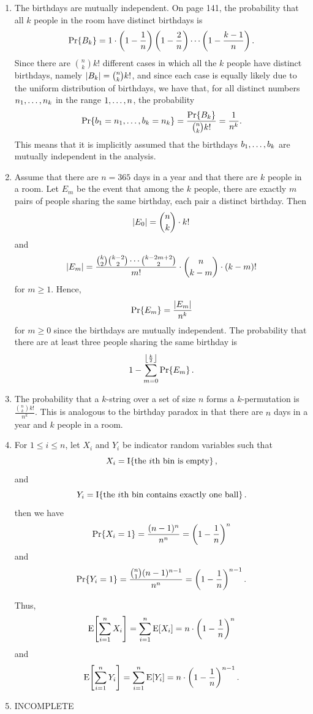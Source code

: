 \begin{enumerate}[\thesection-1]
Let $X$ be the number of tosses until some bin contains two balls. Then, for $2 \leq k \leq b + 1$ we have
\[
\pr{X = k} = \pr{\cmpl{A_k} \intsc B_{k - 1}} = \pr{B_{k - 1}} \pr{\cmpl{A_k} \given B_{k - 1}} = 1 \multp \parenf{1 - \frac{1}{b}} \parenf{1 - \frac{2}{b}} \etc \parenf{1 - \frac{k - 2}{b}} \multp \frac{k - 1}{b}.
\]
It suffices to compute
\[
\ex{X} = \sum^{b + 1}_{k = 2} k \pr{X = k}.
\]
%
\item The birthdays are mutually independent. On page 141, the probability that all $k$ people in the room have distinct birthdays is
\[
\Pr\!\left\{B_k\right\} = 1 \cdot \left(1 - \frac{1}{n}\right) \left(1 - \frac{2}{n}\right) \cdots \left(1 - \frac{k - 1}{n}\right).
\]
Since there are ${n \choose k} k!$ different cases in which all the $k$ people have distinct birthdays, namely $\left|B_k\right| = {n \choose k} k!$, and since each case is equally likely due to the uniform distribution of birthdays, we have that, for all distinct numbers $n_1, \ldots, n_k$ in the range $1, \ldots, n$, the probability
\[
\Pr\!\left\{b_1 = n_1, \ldots, b_k = n_k\right\} = \frac{\Pr\!\left\{B_k\right\}}{{n \choose k} k!} = \frac{1}{n^k}.
\]
This means that it is implicitly assumed that the birthdays $b_1, \ldots, b_k$ are mutually independent in the analysis.
%
\item Assume that there are $n = 365$ days in a year and that there are $k$ people in a room. Let $E_m$ be the event that among the $k$ people, there are exactly $m$ pairs of people sharing the same birthday, each pair a distinct birthday. Then
\[
\left|E_0\right| = {n \choose k} \cdot k!
\]
and
\[
\left|E_m\right| = \frac{{k \choose 2}{k - 2 \choose 2} \cdots {k - 2m + 2 \choose 2}}{m!} \cdot {n \choose k - m} \cdot (k - m)!
\]
for $m \geq 1$. Hence,
\[
\Pr\!\left\{E_m\right\} = \frac{\left|E_m\right|}{n^k}
\]
for $m \geq 0$ since the birthdays are mutually independent. The probability that there are at least three people sharing the same birthday is
\[
1 - \sum^{\left\lfloor\frac{k}{2}\right\rfloor}_{m = 0} \Pr\!\left\{E_m\right\}.
\]
%
\item The probability that a $k$-string over a set of size $n$ forms a $k$-permutation is $\frac{{n \choose k} k!}{n^k}$. This is analogous to the birthday paradox in that there are $n$ days in a year and $k$ people in a room.
%
\item For $1 \leq i \leq n$, let $X_i$ and $Y_i$ be indicator random variables such that
\[
X_i = \ind{\mbox{the \mathmode{i}th bin is empty}},
\]
and
\[
Y_i = \ind{\mbox{the \mathmode{i}th bin contains exactly one ball}}.
\]
then we have
\[
\Pr\!\left\{X_i = 1\right\} = \frac{(n - 1)^n}{n^n} = \left(1 - \frac{1}{n}\right)^n
\]
and
\[
\Pr\!\left\{Y_i = 1\right\} = \frac{{n \choose 1}(n - 1)^{n - 1}}{n^n} = \left(1 - \frac{1}{n}\right)^{n - 1}.
\]

Thus,
\[
\mathrm{E}\!\left[\sum^n_{i = 1} X_i\right] = \sum^n_{i = 1} \mathrm{E}\!\left[X_i\right] = n \cdot \left(1 - \frac{1}{n}\right)^n
\]
and
\[
\mathrm{E}\!\left[\sum^n_{i = 1} Y_i\right] = \sum^n_{i = 1} \mathrm{E}\!\left[Y_i\right] = n \cdot \left(1 - \frac{1}{n}\right)^{n - 1}.
\]
%
\item INCOMPLETE
%
\end{enumerate}

